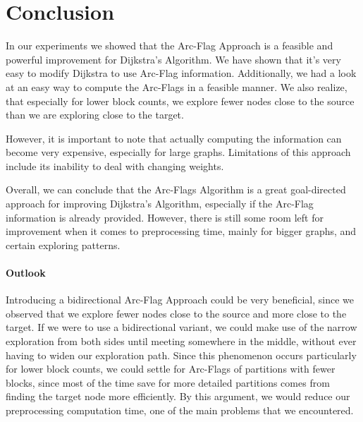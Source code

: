 \documentclass[acmsmall,nonacm,screen,review]{acmart}
\begin{document}
\section{Conclusion}
\label{6}
In our experiments we showed that the Arc-Flag Approach is a feasible and powerful improvement for Dijkstra's Algorithm.
We have shown that it's very easy to modify Dijkstra to use Arc-Flag information. Additionally, we had a look at an easy way to compute the Arc-Flags in a
feasible manner. We also realize, that especially for lower block counts, we explore fewer nodes close to the source than we are exploring close to the target.

However, it is important to note that actually computing the information can become very expensive, especially for large graphs. Limitations of this approach
include its inability to deal with changing weights. 

Overall, we can conclude that the Arc-Flags Algorithm is a great goal-directed approach for improving Dijkstra's Algorithm, especially if the Arc-Flag
information is already provided. However, there is still some room left for improvement when it comes to preprocessing time, mainly for bigger graphs,
and certain exploring patterns.

\paragraph{Outlook}
Introducing a bidirectional Arc-Flag Approach could be very beneficial, since we observed that we explore fewer nodes close to the source and more
close to the target. If we were to use a bidirectional variant, we could make use of the narrow exploration from both sides until meeting somewhere
in the middle, without ever having to widen our exploration path. Since this phenomenon occurs particularly for lower block counts, we could settle for
Arc-Flags of partitions with fewer blocks, since most of the time save for more detailed partitions comes from finding the target node more efficiently.
By this argument, we would reduce our preprocessing computation time, one of the main problems that we encountered.



\end{document}
